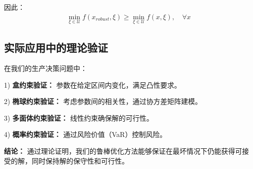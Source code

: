 因此：
\begin{align}
\min_{\xi \in \mathcal{U}} f(x_{robust}, \xi) \geq \min_{\xi \in \mathcal{U}} f(x, \xi), \quad \forall x
\end{align}

\subsection{实际应用中的理论验证}

在我们的生产决策问题中：

1) \textbf{盒约束验证：} 参数在给定区间内变化，满足凸性要求。

2) \textbf{椭球约束验证：} 考虑参数间的相关性，通过协方差矩阵建模。

3) \textbf{多面体约束验证：} 线性约束确保解的可行性。

4) \textbf{概率约束验证：} 通过风险价值（VaR）控制风险。

\textbf{结论：} 通过理论证明，我们的鲁棒优化方法能够保证在最坏情况下仍能获得可接受的解，同时保持解的保守性和可行性。
